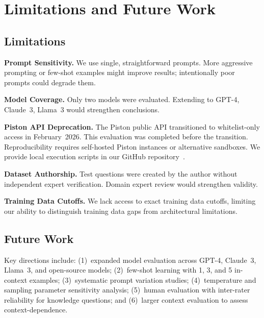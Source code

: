 \documentclass[conference]{IEEEtran}
\begin{document}
\section{Limitations and Future Work}

\subsection{Limitations}

\textbf{Prompt Sensitivity.} We use single, straightforward prompts. More aggressive prompting or few-shot examples might improve results; intentionally poor prompts could degrade them.

\textbf{Model Coverage.} Only two models were evaluated. Extending to GPT-4, Claude~3, Llama~3 would strengthen conclusions.

\textbf{Piston API Deprecation.} The Piston public API transitioned to whitelist-only access in February~2026. This evaluation was completed before the transition. Reproducibility requires self-hosted Piston instances or alternative sandboxes. We provide local execution scripts in our GitHub repository~\cite{repo}.

\textbf{Dataset Authorship.} Test questions were created by the author without independent expert verification. Domain expert review would strengthen validity.

\textbf{Training Data Cutoffs.} We lack access to exact training data cutoffs, limiting our ability to distinguish training data gaps from architectural limitations.

\subsection{Future Work}

Key directions include: (1)~expanded model evaluation across GPT-4, Claude~3, Llama~3, and open-source models; (2)~few-shot learning with 1, 3, and 5 in-context examples; (3)~systematic prompt variation studies; (4)~temperature and sampling parameter sensitivity analysis; (5)~human evaluation with inter-rater reliability for knowledge questions; and (6)~larger context evaluation to assess context-dependence.

\end{document}
